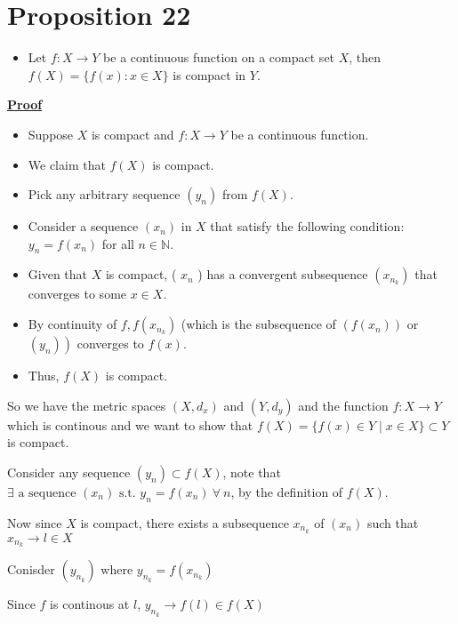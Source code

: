 \documentclass[12pt,a4paper]{article}
\author{Laxman Singh}
\date{\today}
\title{}
\begin{document}
\section{Proposition 22}
\begin{itemize}
    \item Let \(f: X \rightarrow Y\) be a continuous function on a compact set \(X\), then \(f(X)=\{f(x): x \in X\}\) is compact in \(Y\).
\end{itemize}
\underline{\textbf{Proof}}
\begin{itemize}
    \item Suppose \(X\) is compact and \(f: X \rightarrow Y\) be a continuous function.
    \item We claim that \(f(X)\) is compact.
    \item Pick any arbitrary sequence \(\left(y_n\right)\) from \(f(X)\).
    \item Consider a sequence \(\left(x_n\right)\) in \(X\) that satisfy the following condition: \(y_n=f\left(x_n\right)\) for all \(n \in \mathbb{N}\).
    \item Given that \(X\) is compact, ( \(x_n\) ) has a convergent subsequence \(\left(x_{n_k}\right)\) that converges to some \(x \in X\).
    \item By continuity of \(f, f\left(x_{n_k}\right)\) (which is the subsequence of \(\left(f\left(x_n\right)\right)\) or \(\left.\left(y_n\right)\right)\) converges to \(f(x)\).
    \item Thus, \(f(X)\) is compact.
\end{itemize}

So we have the metric spaces \((X,d_{x})\) and \((Y,d_{y})\) and the function \(f: X \to Y\) which is continous and we want to show that \(f(X)=\{f(x) \in Y \mid x \in X\} \subset Y\) is compact. 

Consider any sequence \((y_{n}) \subset f(X)\), note that \(\exists \text{ a sequence } (x_{n}) \text{ s.t. } y_{n}=f(x_{n}) \ \forall \ n\), by the definition of \(f(X)\).

Now since \(X\) is compact, there exists a subsequence \(x_{n_{k}}\) of \((x_{n})\) such that \(x_{n_{k}} \to l \in X \)

Conisder \((y_{n_{k}})\) where \(y_{n_{k}} = f(x_{n_{k}})\)

Since \(f\) is continous at \(l\), \(y_{n_{k}} \to f(l) \in f(X)\)     
\end{document}
